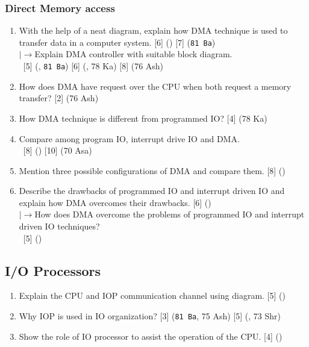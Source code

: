 \documentclass[12pt]{article}
\newcommand{\lb}{\\$\left|\rightarrow\right.$}
\newcommand{\enter}{\\\textcolor{white}{1}}
\begin{document}
	\subsubsection{Direct Memory access}
		\begin{enumerate}
			\item With the help of a neat diagram, explain how DMA technique is used to transfer data in a computer system. \hfill [6] () [7] (\texttt{81 Ba})
			\lb Explain DMA controller with suitable block diagram.
			\enter\hfill [5] (, \texttt{81 Ba}) [6] (, 78 Ka) [8] (76 Ash)

			\item How does DMA have request over the CPU when both request a memory transfer? \hfill [2] (76 Ash)

			\item How DMA technique is different from programmed IO? \hfill [4] (78 Ka)

			\item Compare among program IO, interrupt drive IO and DMA.
			\enter\hfill [8] () [10] (70 Asa)

			\item Mention three possible configurations of DMA and compare them. \hfill [8] ()
				
			\item Describe the drawbacks of programmed IO and interrupt driven IO and explain how DMA overcomes their drawbacks. \hfill [6] ()
			\lb How does DMA overcome the problems of programmed IO and interrupt driven IO techniques?
			\enter\hfill [5] ()
		\end{enumerate}

	\subsection{I/O Processors}
		\begin{enumerate}
			\item Explain the CPU and IOP communication channel using diagram. \hfill [5] ()

			\item Why IOP is used in IO organization? \hfill [3] (\texttt{81 Ba}, 75 Ash) [5] (, 73 Shr)

			\item Show the role of IO processor to assist the operation of the CPU. \hfill [4] ()
		\end{enumerate}
\end{document}
